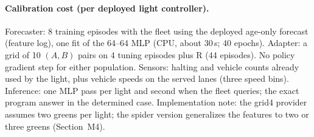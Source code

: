\documentclass[11pt]{article}
\begin{document}
\paragraph{Calibration cost (per deployed light controller).} Forecaster: 8 training episodes with the fleet using the deployed age-only
forecast (feature log), one fit of the 64--64 MLP (CPU, about 30\,s; 40 epochs). Adapter: a grid of 10 $(A,B)$
pairs on 4 tuning episodes plus R (44 episodes). No policy gradient step for either population. Sensors: halting and vehicle counts already
used by the light, plus vehicle speeds on the served lanes (three speed bins). Inference: one MLP pass per light and second when the fleet
queries; the exact program answer in the determined case. Implementation note: the grid4 provider assumes two greens per light; the spider
version generalizes the features to two or three greens (Section~M4).
\end{document}
